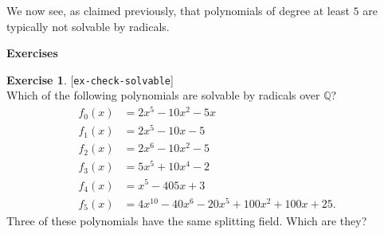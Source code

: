 \documentclass{amsart}
\newcommand{\Q}         {{\mathbb{Q}}}
\renewcommand{\:}{\colon}
\newcommand{\lastexlabel}{}
\newcommand{\exlabel}[1]{
 \global\def\lastexlabel{#1}\label{#1}[\texttt{#1}]\ \\
}
\newcommand{\exlabel}[1]{
 \global\def\lastexlabel{#1}\label{#1}
}
\theoremstyle{definition}
\newtheorem{exercise}{Exercise}[section]
\begin{document}
We now see, as claimed previously, that polynomials of degree at least
$5$ are typically not solvable by radicals.


\begin{center}
 \Large \textbf{Exercises}
\end{center}

\begin{exercise}\exlabel{ex-check-solvable}
 Which of the following polynomials are solvable by radicals over $\Q$?
 \begin{align*}
  f_0(x) &= 2x^5-10x^2-5x \\
  f_1(x) &= 2x^5-10x-5    \\
  f_2(x) &= 2x^6-10x^2-5  \\
  f_3(x) &= 5x^5+10x^4-2  \\
  f_4(x) &= x^5-405x+3    \\
  f_5(x) &= 4x^{10}-40x^6-20x^5+100x^2+100x+25.
 \end{align*}
 Three of these polynomials have the same splitting field. Which are they?
\end{exercise}
\end{document}

